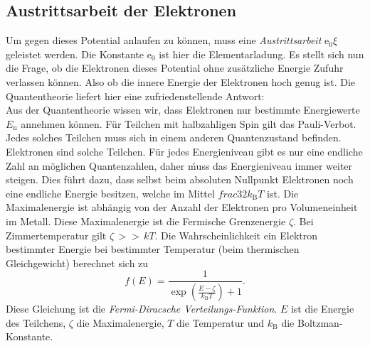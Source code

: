 \subsection{Austrittsarbeit der Elektronen}

Um gegen dieses Potential anlaufen zu können, muss eine
\textit{Austrittsarbeit} $\mathrm{e}_0 \xi$ geleistet
werden. Die Konstante $\mathrm{e}_0$ ist hier die
Elementarladung.
Es stellt sich nun die Frage, ob die Elektronen dieses
Potential ohne zusätzliche Energie Zufuhr verlassen können.
Also ob die innere Energie der Elektronen hoch genug ist.
Die Quantentheorie liefert hier eine zufriedenstellende 
Antwort:\\
Aus der Quantentheorie wissen wir, dass Elektronen 
nur bestimmte Energiewerte $E_{\mathrm{n}}$ annehmen können.
Für Teilchen mit halbzahligen Spin gilt das Pauli-Verbot.
Jedes solches Teilchen muss sich in einem anderen Quantenzustand
befinden. Elektronen sind solche Teilchen. Für jedes Energieniveau
gibt es nur eine endliche Zahl an möglichen Quantenzahlen,
daher ḿuss das Energieniveau immer weiter steigen.
Dies führt dazu, dass selbst beim absoluten Nullpunkt
Elektronen noch eine endliche Energie besitzen, welche im 
Mittel $frac{3}{2} k_{\mathrm{B}} T$ ist. Die Maximalenergie
ist abhängig von der Anzahl der Elektronen pro Volumeneinheit 
im Metall. Diese Maximalenergie ist die Fermische Grenzenergie
$\zeta$. Bei Zimmertemperatur gilt $\zeta \, >> \, kT$. Die
Wahrscheinlichkeit ein Elektron bestimmter Energie bei 
bestimmter Temperatur (beim thermischen Gleichgewicht) berechnet
sich zu 
\begin{equation}
    \label{eqn:FermiDirac}
    f(E) = \frac{1}{\exp{\left(\frac{E - \zeta}{k_{\mathrm{B}}T}\right)}+1}.
\end{equation}
Diese Gleichung ist die \textit{Fermi-Diracsche Verteilungs-Funktion}.
$E$ ist die Energie des Teilchens, $\zeta$ die Maximalenergie,
$T$ die Temperatur und $k_{\mathrm{B}}$ die Boltzman-Konstante.

